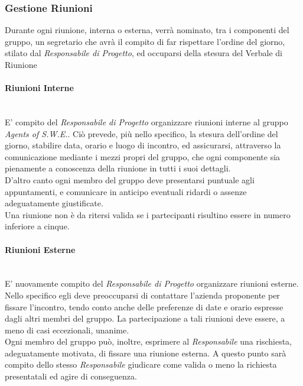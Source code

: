 \subsubsection{Gestione Riunioni}
	Durante ogni riunione, interna o esterna, verrà nominato, tra i componenti del gruppo, un segretario che avrà il 		compito di far rispettare l'ordine del giorno, stilato dal \textit{Responsabile di Progetto}, ed occuparsi della 		stesura del	Verbale di Riunione\glossario

\paragraph{Riunioni Interne} ~\\
	E' compito del \textit{Responsabile di Progetto} organizzare riunioni interne al gruppo \textit{Agents of 						S.W.E.}. Ciò prevede, più nello specifico, la stesura dell'ordine del giorno, stabilire data, orario e luogo di 			incontro, ed assicurarsi, attraverso la comunicazione mediante i mezzi propri del gruppo, che ogni componente sia 	pienamente a conoscenza della riunione in tutti i suoi dettagli. \\
	D'altro canto ogni membro del gruppo deve presentarsi puntuale agli appuntamenti, e comunicare in anticipo 					eventuali ridardi o assenze adeguatamente giustificate. \\
	Una riunione non è da ritersi valida se i partecipanti risultino essere in numero inferiore a cinque.

\paragraph{Riunioni Esterne} ~\\
	E' nuovamente compito del \textit{Responsabile di Progetto} organizzare riunioni esterne. Nello specifico egli 			deve preoccuparsi di contattare l'azienda proponente per fissare l'incontro, tendo conto anche delle preferenze 			di date e orario espresse dagli altri membri del gruppo. La partecipazione a tali riunioni deve essere, a meno di 	casi eccezionali, unanime.\\
	Ogni membro del gruppo può, inoltre, esprimere al \textit{Responsabile} una rischiesta, adeguatamente motivata, 			di fissare una riunione esterna. A questo punto sarà compito dello stesso \textit{Responsabile} giudicare come 			valida o meno la richiesta presentatali ed agire di conseguenza.

